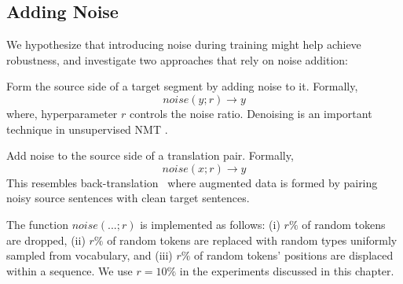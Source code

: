 \subsection{Adding Noise}
We hypothesize that introducing noise during training might help achieve robustness, and investigate two approaches that rely on noise addition:
\begin{description}[itemsep=0.5mm,topsep=0pt,leftmargin=5mm]
\item[DenoiseTgt:] Form the source side of a target segment by adding noise to it. 
Formally, $$noise(y; r) \rightarrow y$$ where, hyperparameter $r$ controls the noise ratio.
Denoising is an important technique in unsupervised NMT \cite{Artetxe-2018-unmt-iclr,Lample-2018-unmt-iclr}.

\item[NoisySrc:] Add noise to the source side of a translation pair.
Formally, $$noise(x; r) \rightarrow y$$ 
This resembles back-translation~\cite{sennrich-etal-2016-improving} where augmented data is formed by pairing noisy source sentences with clean target sentences.

\end{description}

The function $noise(...; r)$ is implemented as follows: %
(i) $r\%$ of random tokens are dropped, 
(ii) $r\%$ of random tokens are replaced with random types uniformly sampled from vocabulary, and 
(iii) $r\%$ of random tokens' positions are displaced within a sequence.
We use $r=10\%$ in the experiments discussed in this chapter.

